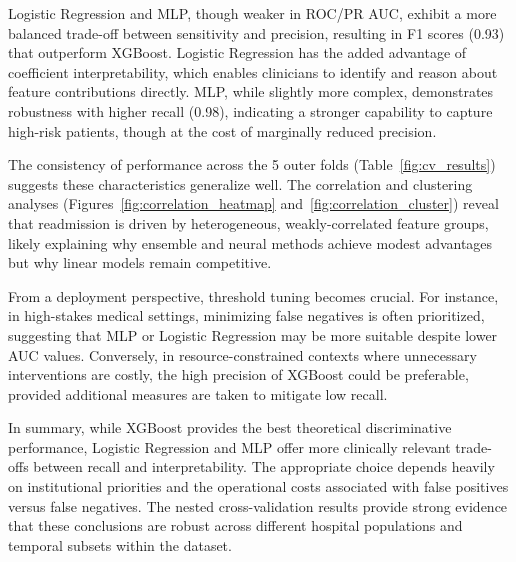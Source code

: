 Logistic Regression and MLP, though weaker in ROC/PR AUC, exhibit a more balanced trade-off between sensitivity and precision, resulting in F1 scores (0.93) that outperform XGBoost. Logistic Regression has the added advantage of coefficient interpretability, which enables clinicians to identify and reason about feature contributions directly. MLP, while slightly more complex, demonstrates robustness with higher recall (0.98), indicating a stronger capability to capture high-risk patients, though at the cost of marginally reduced precision. 

The consistency of performance across the 5 outer folds (Table~\ref{fig:cv_results}) suggests these characteristics generalize well. The correlation and clustering analyses (Figures~\ref{fig:correlation_heatmap} and~\ref{fig:correlation_cluster}) reveal that readmission is driven by heterogeneous, weakly-correlated feature groups, likely explaining why ensemble and neural methods achieve modest advantages but why linear models remain competitive.

From a deployment perspective, threshold tuning becomes crucial. For instance, in high-stakes medical settings, minimizing false negatives is often prioritized, suggesting that MLP or Logistic Regression may be more suitable despite lower AUC values. Conversely, in resource-constrained contexts where unnecessary interventions are costly, the high precision of XGBoost could be preferable, provided additional measures are taken to mitigate low recall. 

In summary, while XGBoost provides the best theoretical discriminative performance, Logistic Regression and MLP offer more clinically relevant trade-offs between recall and interpretability. The appropriate choice depends heavily on institutional priorities and the operational costs associated with false positives versus false negatives. The nested cross-validation results provide strong evidence that these conclusions are robust across different hospital populations and temporal subsets within the dataset.



